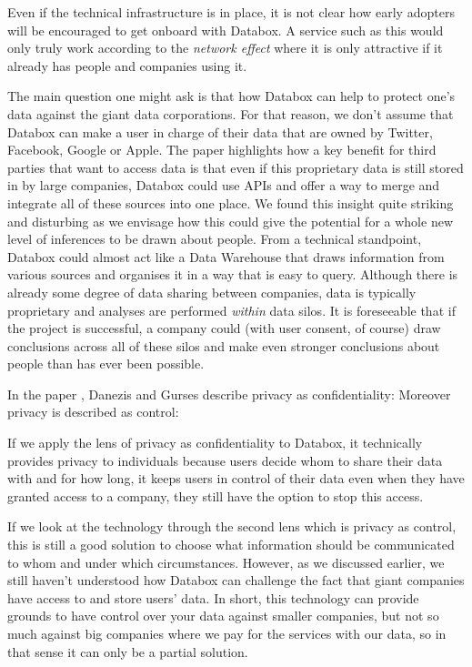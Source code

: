 \documentclass[format=acmsmall, review=false, screen=true]{acmart}
\begin{document}
Even if the technical infrastructure is in place, it is not clear how early adopters will be encouraged to get onboard with Databox. A service such as this would only truly work according to the \textit{network effect} where it is only attractive if it already has people and companies using it.

The main question one might ask is that how Databox can help to protect one’s data against the giant data corporations. For that reason, we don’t assume that Databox can make a user in charge of their data that are owned by Twitter, Facebook, Google or Apple. The paper highlights how a key benefit for third parties that want to access data is that even if this proprietary data is still stored in  by large companies, Databox could use APIs and offer a way to merge and integrate all of these sources into one place. We found this insight quite striking and disturbing as we envisage how this could give the potential for a whole new level of inferences to be drawn about people. From a technical standpoint, Databox could almost act like a Data Warehouse that draws information from various sources and organises it in a way that is easy to query. Although there is already some degree of data sharing between companies, data is typically proprietary and analyses are performed \textit{within} data silos. It is foreseeable that if the project is successful, a company could (with user consent, of course) draw conclusions across all of these silos and make even stronger conclusions about people than has ever been possible.

In the paper , Danezis and Gurses describe privacy as confidentiality:  Moreover privacy is described as control: 

If we apply the lens of privacy as confidentiality to Databox, it technically provides privacy to individuals because users decide whom to share their data with and for how long, it keeps users in control of their data even when they have granted access to a company, they still have the option to stop this access.

If we look at the technology through the second lens which is privacy as control, this is still a good solution to choose what information should be communicated to whom and under which circumstances. However, as we discussed earlier, we still haven’t understood how Databox can challenge the fact that giant companies have access to and store users’ data. In short, this technology can provide grounds to have control over your data against smaller companies, but not so much against big companies where we pay for the services with our data, so in that sense it can only be a partial solution.
\end{document}
